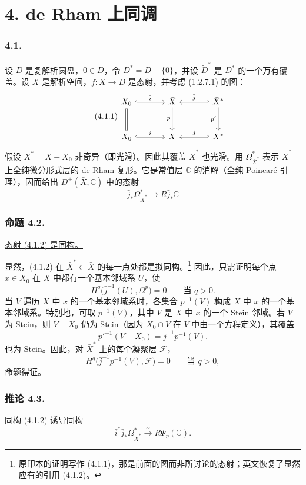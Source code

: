 \section*{4. de Rham 上同调}

\subsubsection*{4.1.}
设 $D$ 是复解析圆盘，$0\in D$，令 $D^*=D-\{0\}$，并设 $\widetilde D^*$ 是 $D^*$ 的一个万有覆盖。设 $X$ 是解析空间，$f:X\longrightarrow D$ 是态射，并考虑 (1.2.7.1) 的图：
\begin{equation}\tag{4.1.1}
\begin{tikzcd}[column sep=large,row sep=large]
X_0 \arrow[r,hook,"\bar i"] \arrow[d,equal]
  & \bar X \arrow[d,"p"']
  & \bar X^* \arrow[l,hook',"\bar j"'] \arrow[d,"p'"'] \\
X_0 \arrow[r,hook,"i"]
  & X
  & X^* \arrow[l,hook',"j"']
\end{tikzcd}
\end{equation}
假设 $X^*=X-X_0$ 非奇异（即光滑）。因此其覆盖 $\bar X^*$ 也光滑。用 $\Omega_{\bar X^*}^*$ 表示 $\bar X^*$ 上全纯微分形式层的 de Rham 复形。它是常值层 $\mathbb C$ 的消解（全纯 Poincaré 引理），因而给出 $D^+(\bar X,\mathbb C)$ 中的态射
\begin{equation}\tag{4.1.2}
\bar j_*\Omega_{\bar X^*}^*
\longrightarrow R\bar j_*\mathbb C
\end{equation}

\subsubsection*{命题 4.2.}
\underline{态射 (4.1.2) 是同构。}

显然，(4.1.2) 在 $\bar X^*\subset\bar X$ 的每一点处都是拟同构。\footnote{原印本的证明写作 (4.1.1)，那是前面的图而非所讨论的态射；英文恢复了显然应有的引用 (4.1.2)。}
因此，只需证明每个点 $x\in X_0$ 在 $\bar X$ 中都有一个基本邻域系 $U$，使
\[
H^q\bigl(\bar j^{-1}(U),\Omega^p\bigr)=0
\qquad\text{当 }q>0.
\]
当 $V$ 遍历 $X$ 中 $x$ 的一个基本邻域系时，各集合 $p^{-1}(V)$ 构成 $\bar X$ 中 $x$ 的一个基本邻域系。特别地，可取 $p^{-1}(V)$，其中 $V$ 是 $X$ 中 $x$ 的一个 Stein 邻域。若 $V$ 为 Stein，则 $V-X_0$ 仍为 Stein（因为 $X_0\cap V$ 在 $V$ 中由一个方程定义），其覆盖
\[
p'^{-1}(V-X_0)=\bar j^{-1}p^{-1}(V).
\]
也为 Stein。因此，对 $\bar X^*$ 上的每个凝聚层 $\mathcal F$，
\[
H^q\bigl(\bar j^{-1}p^{-1}(V),\mathcal F\bigr)=0
\qquad\text{当 }q>0,
\]
命题得证。

\subsubsection*{推论 4.3.}
\underline{同构 (4.1.2) 诱导同构}
\begin{equation}\tag{4.3.1}
\bar i^*\bar j_*\Omega_{\bar X^*}^*
\xrightarrow{\ \sim\ }R\Psi_\eta(\mathbb C).
\end{equation}

